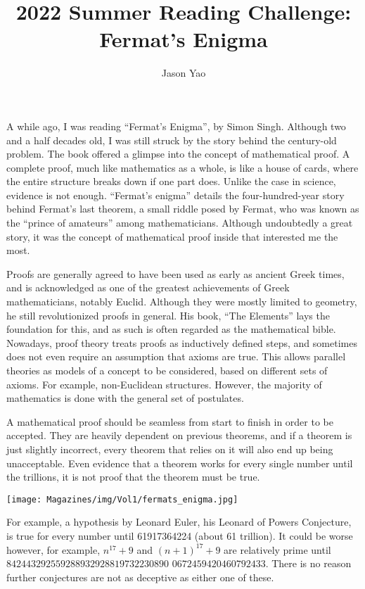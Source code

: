 \documentclass{article}
\title{2022 Summer Reading Challenge: Fermat’s Enigma}
\author{Jason Yao}
\begin{document}
\maketitle
A while ago, I was reading “Fermat’s Enigma”, by Simon Singh. Although two and a half decades old, I was still struck by the story behind the century-old problem. The book offered a glimpse into the concept of mathematical proof. A complete proof, much like mathematics as a whole, is like a house of cards, where the entire structure breaks down if one part does. Unlike the case in science, evidence is not enough. “Fermat’s enigma” details the four-hundred-year story behind Fermat’s last theorem, a small riddle posed by Fermat, who was known as the “prince of amateurs” among mathematicians. Although undoubtedly a great story, it was the concept of mathematical proof inside that interested me the most.

Proofs are generally agreed to have been used as early as ancient Greek times, and is acknowledged as one of the greatest achievements of Greek mathematicians, notably Euclid. Although they were mostly limited to geometry, he still revolutionized proofs in general. His book, “The Elements” lays the foundation for this, and as such is often regarded as the mathematical bible. Nowadays, proof theory treats proofs as inductively defined steps, and sometimes does not even require an assumption that axioms are true. This allows parallel theories as models of a concept to be considered, based on different sets of axioms. For example, non-Euclidean structures. However, the majority of mathematics is done with the general set of postulates.

 
A mathematical proof should be seamless from start to finish in order to be accepted. They are heavily dependent on previous theorems, and if a theorem is just slightly incorrect, every theorem that relies on it will also end up being unacceptable. Even evidence that a theorem works for every single number until the trillions, it is not proof that the theorem must be true.
\begin{center}
   \texttt{[image: Magazines/img/Vol1/fermats\_enigma.jpg]}
\end{center}
For example, a hypothesis by Leonard Euler, his Leonard of Powers Conjecture, is true for every number until 61917364224 (about 61 trillion). It could be worse however, for example, $n^{17}+9$ and $(n+1)^{17} + 9$ are relatively prime until $842443292559288932928819732230890$
$0672459420460792433$. There is no reason further conjectures are not as deceptive as either one of these. 
\end{document}
